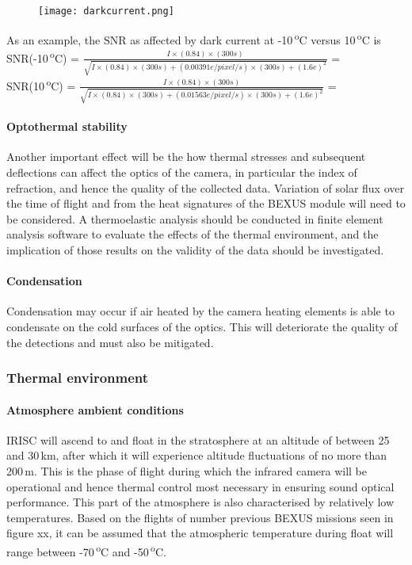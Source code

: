 	\begin{figure}[h!]
    \centering
    \texttt{[image: darkcurrent.png]}
	\label{fig: darkcurrent}
	\end{figure}


As an example, the SNR as affected by dark current at -10\,\textsuperscript{o}C versus 10\,\textsuperscript{o}C is\\

 SNR(-10\,\textsuperscript{o}C) =  $\frac{I\times (0.84)\times (300s)}{\sqrt{I\times (0.84)\times (300s)+(0.00391e/pixel/s)\times (300s)+(1.6e)^2}}$ = \\
 
 SNR(10\,\textsuperscript{o}C) =  $\frac{I\times (0.84)\times (300s)}{\sqrt{I\times (0.84)\times (300s)+(0.01563e/pixel/s)\times (300s)+(1.6e)^2}}$ = \\


\paragraph{Optothermal stability}
Another important effect will be the how thermal stresses and subsequent deflections can affect the optics of the camera, in particular the index of refraction, and hence the quality of the collected data. Variation of solar flux over the time of flight and from the heat signatures of the BEXUS module will need to be considered. A thermoelastic analysis should be conducted in finite element analysis software to evaluate the effects of the thermal environment, and the implication of those results on the validity of the data should be investigated. \

\paragraph{Condensation}
Condensation may occur if air heated by the camera heating elements is able to condensate on the cold surfaces of the optics. This will deteriorate the quality of the detections and must also be mitigated.  \

\subsubsection{Thermal environment}
\paragraph{Atmosphere ambient conditions}
IRISC will ascend to and float in the stratosphere at an altitude of between 25 and 30\,km, after which it will experience altitude fluctuations of no more than 200\,m. This is the phase of flight during which the infrared camera will be operational and hence thermal control most necessary in ensuring sound optical performance. This part of the atmosphere is also characterised by relatively low temperatures. Based on the flights of number previous BEXUS missions seen in figure xx, it can be assumed that the atmospheric temperature during float will range between -70\,\textsuperscript{o}C and -50\,\textsuperscript{o}C. \\

